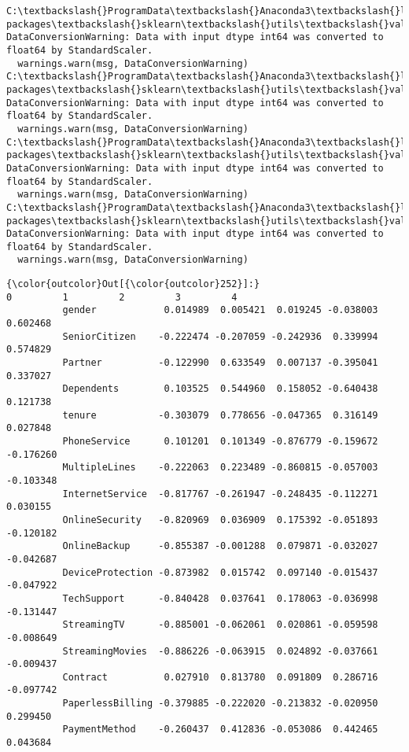 \documentclass[11pt]{article}
\begin{document}
    \begin{Verbatim}[commandchars=\\\{\}]
C:\textbackslash{}ProgramData\textbackslash{}Anaconda3\textbackslash{}lib\textbackslash{}site-packages\textbackslash{}sklearn\textbackslash{}utils\textbackslash{}validation.py:475: DataConversionWarning: Data with input dtype int64 was converted to float64 by StandardScaler.
  warnings.warn(msg, DataConversionWarning)
C:\textbackslash{}ProgramData\textbackslash{}Anaconda3\textbackslash{}lib\textbackslash{}site-packages\textbackslash{}sklearn\textbackslash{}utils\textbackslash{}validation.py:475: DataConversionWarning: Data with input dtype int64 was converted to float64 by StandardScaler.
  warnings.warn(msg, DataConversionWarning)
C:\textbackslash{}ProgramData\textbackslash{}Anaconda3\textbackslash{}lib\textbackslash{}site-packages\textbackslash{}sklearn\textbackslash{}utils\textbackslash{}validation.py:475: DataConversionWarning: Data with input dtype int64 was converted to float64 by StandardScaler.
  warnings.warn(msg, DataConversionWarning)
C:\textbackslash{}ProgramData\textbackslash{}Anaconda3\textbackslash{}lib\textbackslash{}site-packages\textbackslash{}sklearn\textbackslash{}utils\textbackslash{}validation.py:475: DataConversionWarning: Data with input dtype int64 was converted to float64 by StandardScaler.
  warnings.warn(msg, DataConversionWarning)

    \end{Verbatim}

\begin{Verbatim}[commandchars=\\\{\}]
{\color{outcolor}Out[{\color{outcolor}252}]:}                          0         1         2         3         4
          gender            0.014989  0.005421  0.019245 -0.038003  0.602468
          SeniorCitizen    -0.222474 -0.207059 -0.242936  0.339994  0.574829
          Partner          -0.122990  0.633549  0.007137 -0.395041  0.337027
          Dependents        0.103525  0.544960  0.158052 -0.640438  0.121738
          tenure           -0.303079  0.778656 -0.047365  0.316149  0.027848
          PhoneService      0.101201  0.101349 -0.876779 -0.159672 -0.176260
          MultipleLines    -0.222063  0.223489 -0.860815 -0.057003 -0.103348
          InternetService  -0.817767 -0.261947 -0.248435 -0.112271  0.030155
          OnlineSecurity   -0.820969  0.036909  0.175392 -0.051893 -0.120182
          OnlineBackup     -0.855387 -0.001288  0.079871 -0.032027 -0.042687
          DeviceProtection -0.873982  0.015742  0.097140 -0.015437 -0.047922
          TechSupport      -0.840428  0.037641  0.178063 -0.036998 -0.131447
          StreamingTV      -0.885001 -0.062061  0.020861 -0.059598 -0.008649
          StreamingMovies  -0.886226 -0.063915  0.024892 -0.037661 -0.009437
          Contract          0.027910  0.813780  0.091809  0.286716 -0.097742
          PaperlessBilling -0.379885 -0.222020 -0.213832 -0.020950  0.299450
          PaymentMethod    -0.260437  0.412836 -0.053086  0.442465  0.043684
\end{Verbatim}
            
\end{document}
